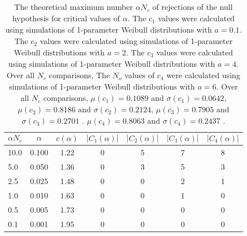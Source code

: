 \begin{table}[h!]
\begin{center}
\begin{tabular}{| l | c | c | c | c | c | c |}\hline
$\alpha N_c$ & $\alpha$ & $c(\alpha)$ & $|C_1(\alpha)|$ & $|C_2(\alpha)|$ & $|C_3(\alpha)|$ & $|C_4(\alpha)|$ \\\hline\hline
10.0 & 0.100 & 1.22 & 0 & 5 & 7 & 8 \\\hline
5.0 & 0.050 & 1.36 & 0 & 3 & 5 & 3 \\\hline
2.5 & 0.025 & 1.48 & 0 & 0 & 2 & 1 \\\hline
1.0 & 0.010 & 1.63 & 0 & 0 & 1 & 0 \\\hline
0.5 & 0.005 & 1.73 & 0 & 0 & 0 & 0 \\\hline
0.1 & 0.001 & 1.95 & 0 & 0 & 0 & 0 \\\hline
\end{tabular}
\caption{The theoretical maximum number $\alpha N_c$ of rejections
        of the null hypothesis for critical values of $\alpha$.
        The $c_1$ values were calculated using simulations of 1-parameter Weibull distributions with $a=0.1$.
        The $c_2$ values were calculated using simulations of 1-parameter Weibull distributions with $a=2$.
        The $c_3$ values were calculated using simulations of 1-parameter Weibull distributions with $a=4$.
        Over all $N_c$ comparisons,
        The $N_o$ values of $c_4$ were calculated using simulations of
         1-parameter Weibull distributions with $a=6$.
        Over all $N_c$ comparisons,
         $\mu(c_1)=0.1089$ and $\sigma(c_1)=0.0642$,
         $\mu(c_2)=0.8186$ and $\sigma(c_2)=0.2124$,
         $\mu(c_3)=0.7905$ and $\sigma(c_3)=0.2701$ .
         $\mu(c_4)=0.8063$ and $\sigma(c_4)=0.2437$ .
        }
\end{center}
\end{table}
